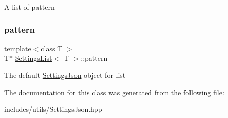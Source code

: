 A list of pattern \mbox{\label{class_settings_list_a6e7e40cd0b7b54ceb0215916b0344609}} 
\subsubsection{\texorpdfstring{pattern}{pattern}}
{\footnotesize\ttfamily template$<$class T $>$ \\
T$\ast$ \hyperlink{class_settings_list}{Settings\+List}$<$ T $>$\+::pattern}

The default \hyperlink{class_settings_json}{Settings\+Json} object for list 

The documentation for this class was generated from the following file\+:\begin{DoxyCompactItemize}
\item 
includes/utils/Settings\+Json.\+hpp\end{DoxyCompactItemize}
